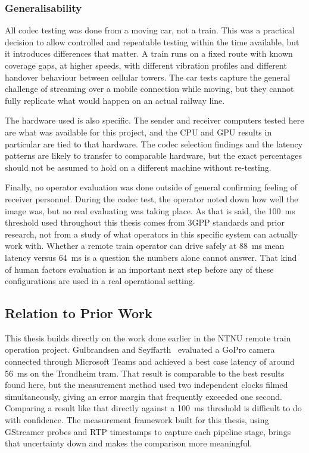 \subsubsection{Generalisability}\label{subsubsec:generalisability}

All codec testing was done from a moving car, not a train. This was a practical decision to allow controlled and repeatable testing within the time available, but it introduces differences that matter. A train runs on a fixed route with known coverage gaps, at higher speeds, with different vibration profiles and different handover behaviour between cellular towers. The car tests capture the general challenge of streaming over a mobile connection while moving, but they cannot fully replicate what would happen on an actual railway line.
 
The hardware used is also specific. The sender and receiver computers tested here are what was available for this project, and the CPU and GPU results in particular are tied to that hardware. The codec selection findings and the latency patterns are likely to transfer to comparable hardware, but the exact percentages should not be assumed to hold on a different machine without re-testing.
 
Finally, no operator evaluation was done outside of general confirming feeling of receiver personnel. During the codec test, the operator noted down how well the image was, but no real evaluating was taking place. As that is said, the 100~ms threshold used throughout this thesis comes from 3GPP standards and prior research, not from a study of what operators in this specific system can actually work with. Whether a remote train operator can drive safely at 88~ms mean latency versus 64~ms is a question the numbers alone cannot answer. That kind of human factors evaluation is an important next step before any of these configurations are used in a real operational setting.

\subsection{Relation to Prior Work}\label{subsec:disc_prior_work}

This thesis builds directly on the work done earlier in the NTNU remote train operation project. Gulbrandsen and Seyffarth~\cite{gulbrandsenSeyffarth2024} evaluated a GoPro camera connected through Microsoft Teams and achieved a best case latency of around 56~ms on the Trondheim tram. That result is comparable to the best results found here, but the measurement method used two independent clocks filmed simultaneously, giving an error margin that frequently exceeded one second. Comparing a result like that directly against a 100~ms threshold is difficult to do with confidence. The measurement framework built for this thesis, using GStreamer probes and RTP timestamps to capture each pipeline stage, brings that uncertainty down and makes the comparison more meaningful.
 
